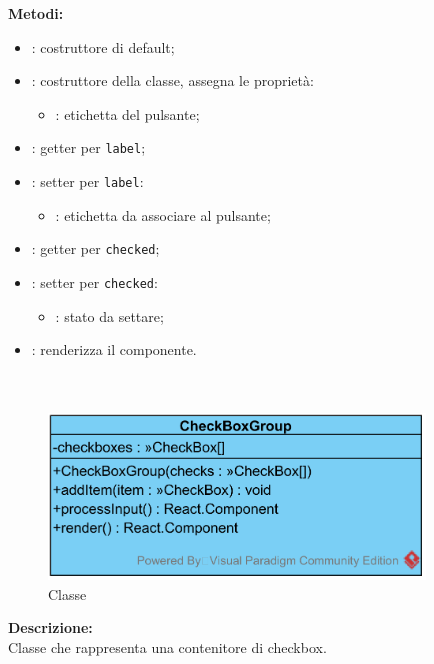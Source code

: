 \textbf{Metodi:}
\begin{itemize}
	\item {}: costruttore di default;
	\item {}: costruttore della classe, assegna le proprietà:
	\begin{itemize}
		\item {}: etichetta del pulsante;
	\end{itemize}
	\item {}: getter per \texttt{label};
	\item {}: setter per \texttt{label}:
	\begin{itemize}
		\item {}: etichetta da associare al pulsante;
	\end{itemize} 
	\item {}: getter per \texttt{checked};
	\item {}: setter per \texttt{checked}:
	\begin{itemize}
		\item {}: stato da settare;
	\end{itemize}
	\item {}: renderizza il componente.
\end{itemize}

\paragraph[::CheckBoxGroup]{\class}\mbox{}\\ \label{\class}
\begin{figure}[H]
	\centering
	\includegraphics[width=10cm]{./diagrammi/framework/view/gui/checkboxgroup.png}
	\caption{Classe \class}
\end{figure}
\textbf{Descrizione:}\\
Classe che rappresenta una contenitore di checkbox.

